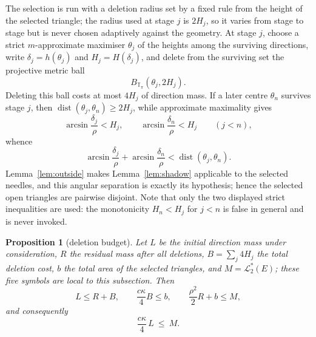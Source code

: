 \documentclass[11pt]{article}
\theoremstyle{plain}
\newtheorem{proposition}[theorem]{Proposition}
\theoremstyle{definition}
\theoremstyle{remark}
\newcommand{\Tp}{\mathbb{T}_{\pi}}
\newcommand{\Lout}{\mathcal{L}^{*}_{2}}
\begin{document}
The selection is run with a deletion radius set by a fixed rule from the height
of the selected triangle; the radius used at stage $j$ is $2H_{j}$, so it varies
from stage to stage but is never chosen adaptively against the geometry. At
stage $j$, choose a strict $m$-approximate maximiser $\theta_{j}$ of the heights
among the surviving directions, write $\delta_{j}=h(\theta_{j})$ and
$H_{j}=H(\delta_{j})$, and delete from the surviving set the projective metric
ball
\[
  B_{\Tp}(\theta_{j},2H_{j}).
\]
Deleting this ball costs at most $4H_{j}$ of direction mass. If a later centre
$\theta_{n}$ survives stage $j$, then $\operatorname{dist}(\theta_{j},\theta_{n})\ge2H_{j}$,
while approximate maximality gives
\[
  \arcsin\frac{\delta_{j}}{\rho}<H_{j},
  \qquad
  \arcsin\frac{\delta_{n}}{\rho}<H_{j}\qquad (j<n),
\]
whence
\[
  \arcsin\frac{\delta_{j}}{\rho}+\arcsin\frac{\delta_{n}}{\rho}
  <\operatorname{dist}(\theta_{j},\theta_{n}).
\]
Lemma~\ref{lem:outside} makes Lemma~\ref{lem:shadow} applicable to the selected
needles, and this angular separation is exactly its hypothesis; hence the
selected open triangles are pairwise disjoint. Note that only the two displayed
strict inequalities are used: the monotonicity $H_{n}<H_{j}$ for $j<n$ is false
in general and is never invoked.

\begin{proposition}[deletion budget]\label{prop:budget}
Let $L$ be the initial direction mass under consideration, $R$ the residual mass
after all deletions, $B=\sum_{j}4H_{j}$ the total deletion cost, $b$ the total
area of the selected triangles, and $M=\Lout(E)$; these five symbols are local to
this subsection. Then
\begin{equation}\label{eq:caseIIthree}
  L\le R+B,\qquad \frac{c\kappa}{4}B\le b,\qquad
  \frac{\rho^{2}}{2}R+b\le M ,
\end{equation}
and consequently
\begin{equation}\label{eq:caseIImain}
  \frac{c\kappa}{4}\,L\ \le\ M .
\end{equation}
\end{proposition}
\end{document}
